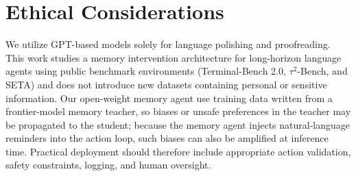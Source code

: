 \section*{Ethical Considerations}
We utilize GPT-based models \citep{openai2023gpt4} solely for language polishing
and proofreading.
%
This work studies a memory intervention architecture for long-horizon language
agents using public benchmark environments (Terminal-Bench 2.0, $\tau^2$-Bench,
and SETA) and does not introduce new datasets containing personal or sensitive
information.
%
Our open-weight memory agent use training data written from a frontier-model memory teacher,
so biases or unsafe preferences in the teacher may be propagated to the student;
because the memory agent injects natural-language reminders into the action
loop, such biases can also be amplified at inference time.
%
Practical deployment should therefore include appropriate action validation,
safety constraints, logging, and human oversight.
